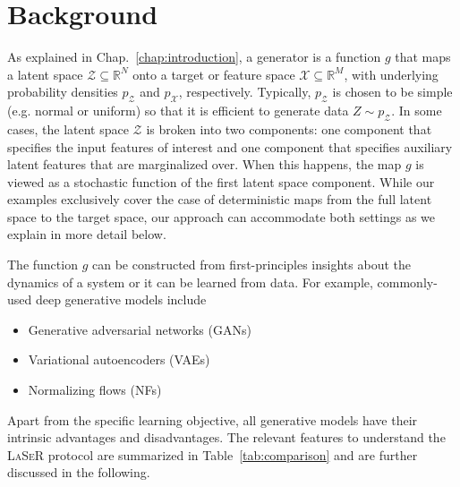\section{Background}
\label{sec:background}
As explained in Chap.~\ref{chap:introduction}, a generator is a function $g$ that maps a latent space $\mathcal{Z}\subseteq \mathbb{R}^N$ onto a target or feature space $\mathcal{X}\subseteq \mathbb{R}^M$, with underlying probability densities $p_\mathcal{Z}$ and $p_\mathcal{X}$, respectively.  Typically, $p_\mathcal{Z}$ is chosen to be simple (e.g. normal or uniform) so that it is efficient to generate data $Z\sim p_\mathcal{Z}$.  In some cases, the latent space $\mathcal{Z}$ is broken into two components: one component that specifies the input features of interest and one component that specifies auxiliary latent features that are marginalized over.  When this happens, the map $g$ is viewed as a stochastic function of the first latent space component.  While our examples exclusively cover the case of deterministic maps from the full latent space to the target space, our approach can accommodate both settings as we explain in more detail below.

The function $g$ can be constructed from first-principles insights about the dynamics of a system or it can be learned from data.  For example, commonly-used deep generative models include

\begin{itemize}
    \item Generative adversarial networks (GANs)~\cite{goodfellow,Creswell2018}
    \item Variational autoencoders (VAEs)~\cite{kingma2014autoencoding,Kingma2019}
    \item Normalizing flows (NFs)~\cite{nflow1,nflow_review} 
\end{itemize}

Apart from the specific learning objective, all generative models have their intrinsic advantages and disadvantages. The relevant features to understand the \textsc{LaSeR} protocol are summarized in Table~\ref{tab:comparison} and are further discussed in the following.

